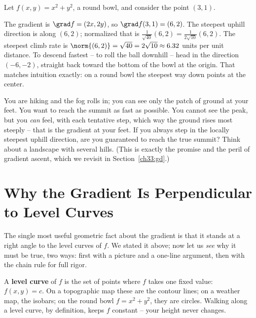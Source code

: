 \begin{example}
\label{ch33:ex-steepest}
Let $f(x,y)=x^2+y^2$, a round bowl, and consider the point $(3,1)$.

The gradient is $\grad f = (2x,2y)$, so $\grad f(3,1)=(6,2)$. The steepest uphill
direction is along $(6,2)$; normalized that is
$\tfrac{1}{\sqrt{40}}(6,2) = \tfrac{1}{2\sqrt{10}}(6,2)$. The steepest climb rate
is $\norm{(6,2)}=\sqrt{40}=2\sqrt{10}\approx 6.32$ units per unit distance. To
descend fastest -- to roll the ball downhill -- head in the direction $(-6,-2)$,
straight back toward the bottom of the bowl at the origin. That matches intuition
exactly: on a round bowl the steepest way down points at the center.
\end{example}

\begin{walkbox}
You are hiking and the fog rolls in; you can see only the patch of ground at your
feet. You want to reach the summit as fast as possible. You cannot see the peak,
but you \emph{can} feel, with each tentative step, which way the ground rises most
steeply -- that is the gradient at your feet. If you always step in the locally
steepest uphill direction, are you guaranteed to reach the true summit? Think
about a landscape with several hills. (This is exactly the promise and the peril
of gradient ascent, which we revisit in Section~\ref{ch33:gd}.)
\end{walkbox}

\section{Why the Gradient Is Perpendicular to Level Curves}
\label{ch33:perp}

The single most useful geometric fact about the gradient is that it stands at a
right angle to the level curves of $f$. We stated it above; now let us \emph{see}
why it must be true, two ways: first with a picture and a one-line argument, then
with the chain rule for full rigor.

A \textbf{level curve} of $f$ is the set of points where $f$ takes one fixed
value: $f(x,y)=c$. On a topographic map these are the contour lines; on a weather
map, the isobars; on the round bowl $f=x^2+y^2$, they are circles. Walking along a
level curve, by definition, keeps $f$ constant -- your height never changes.

